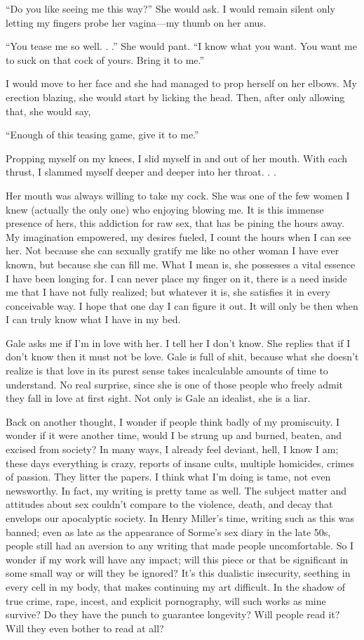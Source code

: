 ``Do you like seeing me this way?'' She would ask. I would remain silent
only letting my fingers probe her vagina---my thumb on her anus.

``You tease me so well. . .'' She would pant. ``I know what you want.
You want me to suck on that cock of yours. Bring it to me.''

I would move to her face and she had managed to prop herself on her
elbows. My erection blazing, she would start by licking the head. Then,
after only allowing that, she would say,

``Enough of this teasing game, give it to me.''

Propping myself on my knees, I slid myself in and out of her mouth. With
each thrust, I slammed myself deeper and deeper into her throat. . .

Her mouth was always willing to take my cock. She was one of the few
women I knew (actually the only one) who enjoying blowing me. It is this
immense presence of hers, this addiction for raw sex, that has be pining
the hours away. My imagination empowered, my desires fueled, I count the
hours when I can see her. Not because she can sexually gratify me like
no other woman I have ever known, but because she can fill me. What I
mean is, she possesses a vital essence I have been longing for. I can
never place my finger on it, there is a need inside me that I have not
fully realized; but whatever it is, she satisfies it in every
conceivable way. I hope that one day I can figure it out. It will only
be then when I can truly know what I have in my bed.

Gale asks me if I'm in love with her. I tell her I don't know. She
replies that if I don't know then it must not be love. Gale is full of
shit, because what she doesn't realize is that love in its purest sense
takes incalculable amounts of time to understand. No real surprise,
since she is one of those people who freely admit they fall in love at
first sight. Not only is Gale an idealist, she is a liar.

Back on another thought, I wonder if people think badly of my
promiscuity. I wonder if it were another time, would I be strung up and
burned, beaten, and excised from society? In many ways, I already feel
deviant, hell, I know I am; these days everything is crazy, reports of
insane cults, multiple homicides, crimes of passion. They litter the
papers. I think what I'm doing is tame, not even newsworthy. In fact, my
writing is pretty tame as well. The subject matter and attitudes about
sex couldn't compare to the violence, death, and decay that envelops our
apocalyptic society. In Henry Miller's time, writing such as this was
banned; even as late as the appearance of Sorme's sex diary in the late
50s, people still had an aversion to any writing that made people
uncomfortable. So I wonder if my work will have any impact; will this
piece or that be significant in some small way or will they be ignored?
It's this dualistic insecurity, seething in every cell in my body, that
makes continuing my art difficult. In the shadow of true crime, rape,
incest, and explicit pornography, will such works as mine survive? Do
they have the punch to guarantee longevity? Will people read it? Will
they even bother to read at all?

